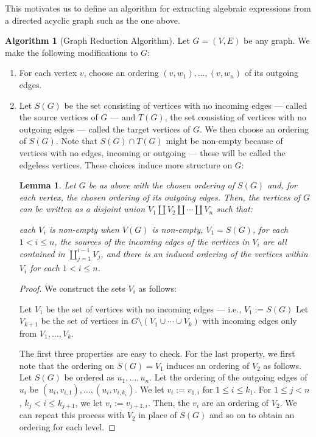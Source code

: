\documentclass{amsart}
\newcommand{\li}[1][]{\ifthenelse{\equal{#1}{}}{\item}{\item \label{#1}}}
\newenvironment{enmrt}{
  \enumerate[(i)]
  \setlength{\itemsep}{0pt}
}{
  \endenumerate
}
\numberwithin{thm}{section}
\newtheorem{lem}[thm]{Lemma}
\theoremstyle{definition}
\newtheorem{alg}[thm]{Algorithm}
\begin{document}
This motivates us to define an algorithm for extracting algebraic expressions
from a directed acyclic graph such as the one above.

\begin{alg}[Graph Reduction Algorithm]\label{alg:expr-construction}
Let $G = (V, E)$ be any graph. We make the following modifications to $G$:
\begin{enumerate}
\setlength{\itemsep}{0pt}

\item For each vertex $v$, choose an ordering $(v, w_1), \dots, (v, w_n)$ of its
outgoing edges.

\item Let $S(G)$ be the set consisting of vertices with no incoming
edges --- called the source vertices of $G$ --- and $T(G)$, the set consisting of
vertices with no outgoing edges --- called the target vertices of $G$. We then
choose an ordering of $S(G)$. Note that $S(G) \cap T(G)$ might be non-empty
because of vertices with no edges, incoming or outgoing --- these will be called
the edgeless vertices. These choices induce more structure on $G$:

\begin{lem}\label{lem:level-ordering}
Let $G$ be as above with the chosen ordering of $S(G)$ and, for each vertex,
the chosen ordering of its outgoing edges. Then, the vertices of $G$ can be
written as a disjoint union $V_1 \amalg V_2 \amalg \cdots \amalg V_n$ such that:
\begin{enmrt}
\li each $V_i$ is non-empty when $V(G)$ is non-empty,
\li $V_1 = S(G)$,
\li for each $1 < i \leq n$, the sources of the incoming edges of the vertices
in $V_i$ are all contained in $\coprod_{j = 1}^{ i - 1} V_{j}$, and
\li there is an induced ordering of the vertices within $V_i$ for each
$1 < i \leq n$.
\end{enmrt}
\end{lem}
\begin{proof}
We construct the sets $V_i$ as follows:
\begin{enmrt}
\li Let $V_1$ be the set of vertices with no incoming edges --- i.e.,
$V_1 := S(G)$
\li Let $V_{k + 1}$ be the set of vertices in
$G \setminus (V_1 \cup \cdots \cup V_k)$ with incoming edges only from
$V_1, \dots, V_k$.
\end{enmrt}
The first three properties are easy to check.
For the last property,
we first note that the ordering on $S(G) = V_1$ induces an ordering of $V_2$ as
follows. Let $S(G)$ be ordered as $u_1, \dots, u_n$. Let the ordering of the
outgoing edges of $u_i$ be $(u_i, v_{i, 1}), \dots, (u_i, v_{i, k_i})$. We let
$v_i := v_{1, i}$ for $1 \leq i \leq k_1$. For $1 \leq j < n$,
$k_j < i \leq k_{j + 1}$, we let $v_i := v_{j + 1, i}$. Then, the $v_i$ are an
ordering of $V_2$. We can repeat this process with $V_2$ in place of $S(G)$ and
so on to obtain an ordering for each level.
\end{proof}


\end{enumerate}
\end{alg}
\end{document}
